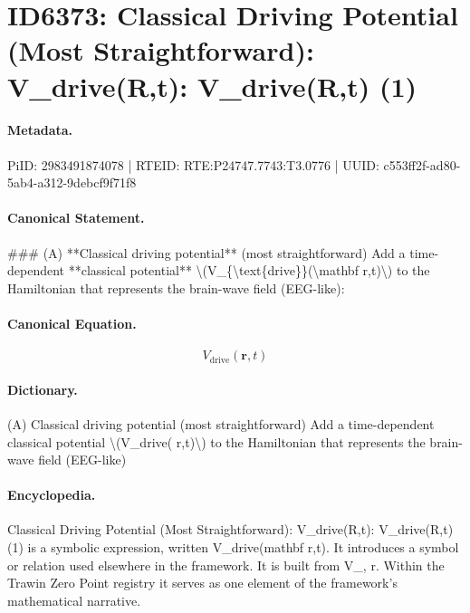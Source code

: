 \section*{ID6373: Classical Driving Potential (Most Straightforward): V\_drive(R,t): V\_drive(R,t) (1)}
\paragraph{Metadata.}
PiID: 2983491874078 | RTEID: RTE:P24747.7743:T3.0776 | UUID: c553ff2f-ad80-5ab4-a312-9debcf9f71f8

\paragraph{Canonical Statement.}
\#\#\# (A) **Classical driving potential** (most straightforward) Add a time-dependent **classical potential** \textbackslash{}(V\_\{\textbackslash{}text\{drive\}\}(\textbackslash{}mathbf r,t)\textbackslash{}) to the Hamiltonian that represents the brain-wave field (EEG-like):

\paragraph{Canonical Equation.}
\[
V_{\text{drive}}(\mathbf r,t)
\]

\paragraph{Dictionary.}
(A) Classical driving potential (most straightforward) Add a time-dependent classical potential \textbackslash{}(V\_drive( r,t)\textbackslash{}) to the Hamiltonian that represents the brain-wave field (EEG-like)

\paragraph{Encyclopedia.}
Classical Driving Potential (Most Straightforward): V\_drive(R,t): V\_drive(R,t) (1) is a symbolic expression, written V\_drive(mathbf r,t). It introduces a symbol or relation used elsewhere in the framework. It is built from V\_, r. Within the Trawin Zero Point registry it serves as one element of the framework's mathematical narrative.
